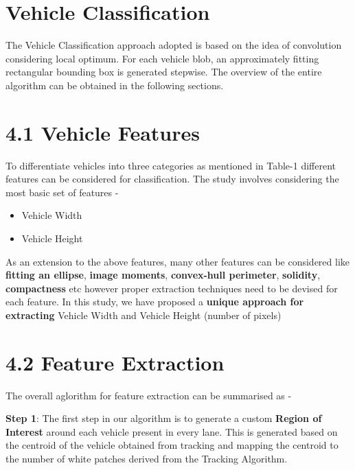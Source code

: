 \documentclass[a4paper,12pt]{article}
\begin{document}
\newpage
\section{Vehicle Classification}

The Vehicle Classification approach adopted is based on the idea of convolution considering local optimum. For each vehicle blob, an approximately fitting rectangular bounding box is generated stepwise. The overview of the entire algorithm can be obtained in the following sections.

\section*{\large 4.1 Vehicle Features}
\vspace{0.1in}

To differentiate vehicles into three categories as mentioned in Table-1 different features can be considered for classification. The study involves considering the most basic set of features -

\begin{itemize}
\setlength{\itemindent}{.2in}
\item Vehicle Width
\item Vehicle Height
\end{itemize}

\begin{flushleft}
As an extension to the above features, many other features can be considered like \textbf{fitting an ellipse}, \textbf{image moments}, \textbf{convex-hull perimeter}, \textbf{solidity}, \textbf{compactness} etc however proper extraction techniques need to be devised for each feature. In this study, we have proposed a \textbf{unique approach for extracting} Vehicle Width and Vehicle Height (number of pixels)
\end{flushleft}

\section*{\large 4.2 Feature Extraction}
\vspace{0.1in}

\begin{flushleft}
The overall aglorithm for feature extraction can be summarised as -
\end{flushleft}

\begin{flushleft}
\textbf{Step 1}: The first step in our algorithm is to generate a custom \textbf{Region of Interest} around each vehicle present in every lane. This is generated based on the centroid of the vehicle obtained from tracking and mapping the centroid to the number of white patches derived from the Tracking Algorithm.
\end{flushleft}
\end{document}
